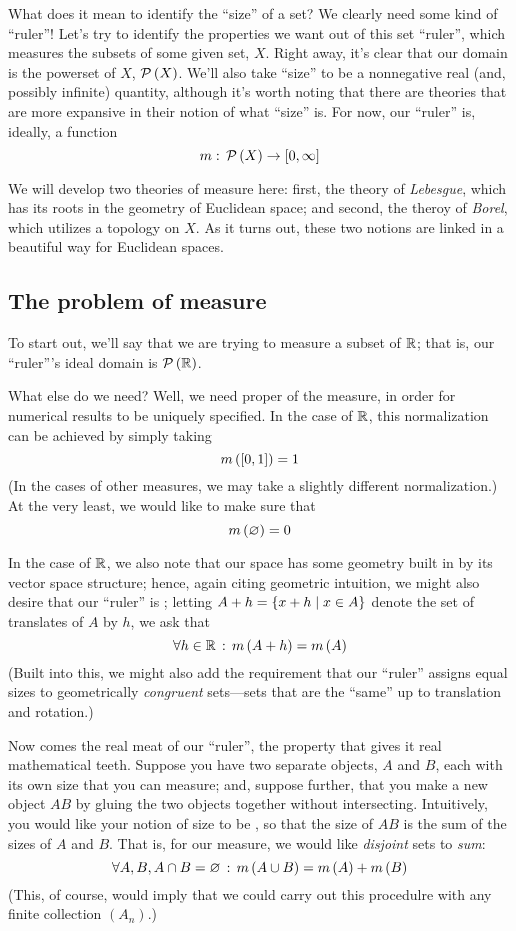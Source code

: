 What does it mean to identify the ``size'' of a set? We clearly need some kind of ``ruler''! Let's try to identify the properties we want out of this set ``ruler'', which measures the subsets of some given set, $X$. Right away, it's clear that our domain is the powerset of $X$, $\mathcal{P}\left( X \right)$. We'll also take ``size'' to be a nonnegative real (and, possibly infinite) quantity, although it's worth noting that there are theories that are more expansive in their notion of what ``size'' is. For now, our ``ruler'' is, ideally, a function
\[ m: \, \mathcal{P}\left( X \right) \to [0,\infty] \]

We will develop two theories of measure here: first, the theory of \emph{Lebesgue}, which has its roots in the geometry of Euclidean space; and second, the theroy of \emph{Borel}, which utilizes a topology on $X$. As it turns out, these two notions are linked in a beautiful way for Euclidean spaces.

\subsection{The problem of measure}

To start out, we'll say that we are trying to measure a subset of $\mathbb{R}$; that is, our ``ruler'''s ideal domain is $\mathcal{P}\left( \mathbb{R} \right)$.

What else do we need? Well, we need proper  of the measure, in order for numerical results to be uniquely specified. In the case of $\mathbb{R}$, this normalization can be achieved by simply taking
\[ m\left( [0,1] \right) = 1\]
(In the cases of other measures, we may take a slightly different normalization.) At the very least, we would like to make sure that
\[ m\left( \varnothing \right) = 0 \]

In the case of $\mathbb{R}$, we also note that our space has some geometry built in by its vector space structure; hence, again citing geometric intuition, we might also desire that our ``ruler'' is ; letting $A + h = \left\{ x + h \mid x \in A \right\}$ denote the set of translates of $A$ by $h$, we ask that
\[ \forall h \in \mathbb{R} \,:\, m\left( A + h \right) = m\left( A \right) \]
(Built into this, we might also add the requirement that our ``ruler'' assigns equal sizes to geometrically \emph{congruent} sets---sets that are the ``same'' up to translation and rotation.)

Now comes the real meat of our ``ruler'', the property that gives it real mathematical teeth. Suppose you have two separate objects, $A$ and $B$, each with its own size that you can measure; and, suppose further, that you make a new object $AB$ by gluing the two objects together without intersecting. Intuitively, you would like your notion of size to be , so that the size of $AB$ is the sum of the sizes of $A$ and $B$. That is, for our measure, we would like \emph{disjoint} sets to \emph{sum}:
\[ \forall A,B,A \cap B = \varnothing \,:\, m\left( A \cup B \right) = m\left( A \right) + m\left( B \right) \]
(This, of course, would imply that we could carry out this procedulre with any finite collection $(A_n)$.)

